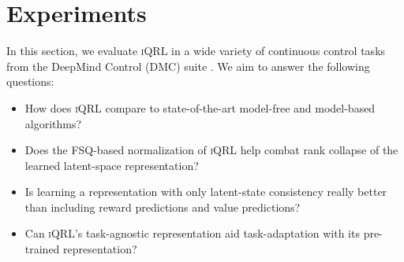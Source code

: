 \documentclass{article}
\theoremstyle{plain}
\theoremstyle{definition}
\theoremstyle{remark}
\newcommand{\our}{\textsc{iQRL}\xspace}
\begin{document}





\section{Experiments}
\label{sec:experiments}
In this section, we evaluate \our in a wide variety of continuous control tasks from the DeepMind Control (DMC) suite \cite{tassa2018deepmind}.
We aim to answer the following questions:
\begin{itemize}
    \item How does \our compare to state-of-the-art model-free and model-based algorithms?
    \item Does the FSQ-based normalization of \our help combat rank collapse of the learned latent-space representation?
    \item Is learning a representation with only latent-state consistency really better than including reward predictions and value predictions?
    \item Can \our's task-agnostic representation aid task-adaptation with its pre-trained representation?
\end{itemize}


\end{document}
